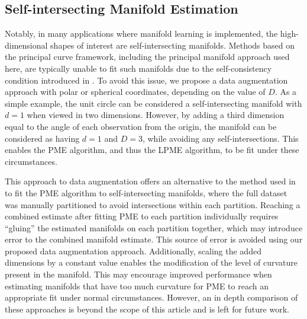 \documentclass[11pt,reqno]{article}
\theoremstyle{definition}
\begin{document}
\subsection{Self-intersecting Manifold Estimation}\label{ss:selfInt}

Notably, in many applications where manifold learning is implemented, the high-dimensional shapes of interest are self-intersecting manifolds. Methods based on the principal curve framework, including the principal manifold approach used here, are typically unable to fit such manifolds due to the self-consistency condition introduced in \cite{hastiePrincipalCurves1989}. To avoid this issue, we propose a data augmentation approach with polar or spherical coordinates, depending on the value of $D$. As a simple example, the unit circle can be considered a self-intersecting manifold with $d = 1$ when viewed in two dimensions. However, by adding a third dimension equal to the angle of each observation from the origin, the manifold can be considered as having $d = 1$ and $D = 3$, while avoiding any self-intersections. This enables the PME algorithm, and thus the LPME algorithm, to be fit under these circumstances.


This approach to data augmentation offers an alternative to the method used in \cite{mengPrincipalManifoldEstimation2021} to fit the PME algorithm to self-intersecting manifolds, where the full dataset was manually partitioned to avoid intersections within each partition. Reaching a combined estimate after fitting PME to each partition individually requires ``gluing'' the estimated manifolds on each partition together, which may introduce error to the combined manifold estimate. This source of error is avoided using our proposed data augmentation approach. Additionally, scaling the added dimensions by a constant value enables the modification of the level of curvature present in the manifold. This may encourage improved performance when estimating manifolds that have too much curvature for PME to reach an appropriate fit under normal circumstances. However, an in depth comparison of these approaches is beyond the scope of this article and is left for future work.
\end{document}
